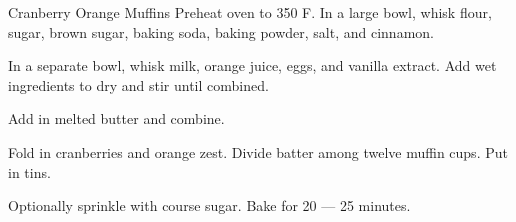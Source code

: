 \documentclass[../main.tex]{subfiles}
\begin{document}
\begin{recipe}{Cranberry Orange Muffins}{}{}
    Preheat oven to 350\degrees{} F.
    In a large bowl, whisk flour, sugar, brown sugar,
    baking soda, baking powder, salt, and cinnamon.

    In a separate bowl, whisk milk, orange juice, eggs,
    and vanilla extract. Add wet ingredients to dry and
    stir until combined.
    
    Add in melted butter and combine.

    Fold in cranberries and orange zest. Divide batter
    among twelve muffin cups. Put in tins.

    Optionally sprinkle with course sugar. Bake for 20
    --- 25 minutes.
\end{recipe}
\end{document}
